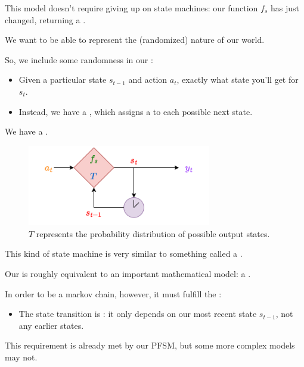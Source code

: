         This model doesn't require giving up on state machines: our function $f_s$ has just changed, returning a .\\

        \begin{concept}
            We want to be able to represent the  (randomized) nature of our world.

            So, we include some randomness in our : 

            \begin{itemize}
                \item Given a particular state $s_{t-1}$ and action $a_t$,  exactly what state you'll get for $s_t$.
                \item Instead, we have a , which assigns a  to each possible next state.
            \end{itemize}

            We have a .
        \end{concept}


        \begin{figure}[H]
            \centering
            \includegraphics[width=80mm,scale=0.5]{images/mdp_images/transition_T.png}
            
            \caption*{$T$ represents the probability distribution of possible output states.}
        \end{figure}

        This kind of state machine is very similar to something called a .\\

        \begin{remark}
            Our  is roughly equivalent to an important mathematical model: a .

            In order to be a markov chain, however, it must fulfill the :

            \begin{itemize}
                \item The state transition is : it only depends on our most recent state $s_{t-1}$, not any earlier states.
            \end{itemize}

            This requirement is already met by our PFSM, but some more complex models may not.
        \end{remark}

